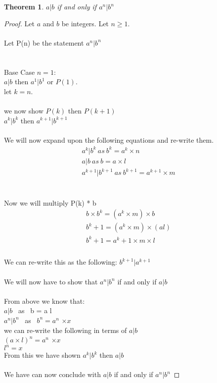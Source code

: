 \documentclass{article}
\newtheorem{thm}{Theorem}[section]
\theoremstyle{definition}
\theoremstyle{remark}
\numberwithin{equation}{section}
\begin{document}
\begin{thm}\label{thm}
$a|b$ if and only if $a^n|b^n$\end{thm}
\begin{proof}
Let $a$ and $b$ be integers. Let $n \geq 1$.  \\ \\ Let P(n) be the statement $a^n|b^n$ \\ \\
\\ Base Case $n = 1$:
\\ $a|b$ then ${a^1}|{b^1}$ or $P(1)$.
\\ let $k = n$.\\ \\we now show $P(k)$ then $P(k+1)$\\
${a^k}|{b^k}$ then ${a^{k+1}}|{b^{k+1}}$\\ \\
We will now expand upon the following equations and re-write them.\\
\begin{equation*}
\begin{split}
{a^k}|{b^k} \ as \ {b^k} = {a^k} \times n\\
a|b \ as \ b = a \times l\\
{a^{k+1}|b^{k+1}} \ as \ b^{k+1} = a^{k+1} \times m
\end{split}
\end{equation*}
\\ \\Now we will multiply P(k) * b\\
\begin{align*}
b \times {b^k} = ({a^k} \times m) \times b \\
{b^k+1} = ({a^k} \times m) \times (al) \\
{b^k+1} = {a^k+1} \times m \times l \\
\end{align*}
\\We can re-write this as the following: ${b^{k+1}}|{a^{k+1}}$
\\\\We will now have to show that $a^n|b^n$ if and only if $a|b$ 
\\
\\
From above we know that:\\
$a|b$ \ as \ b = a \times l\\
${a^n}|{b^n}$ \ as \ ${b^n} = {a^n}$ $\times x$\\
we can re-write the following in terms of $a|b$\\
${{(a \times l)}^n} = {a^n}$ $\times x$\\
${l}^n = x$
\\From this we have shown ${a^k}|{b^k}$ then ${a}|{b}$
\\\\
We have can now conclude with $a|b$ if and only if $a^n|b^n$

\end{proof}
\end{document}

